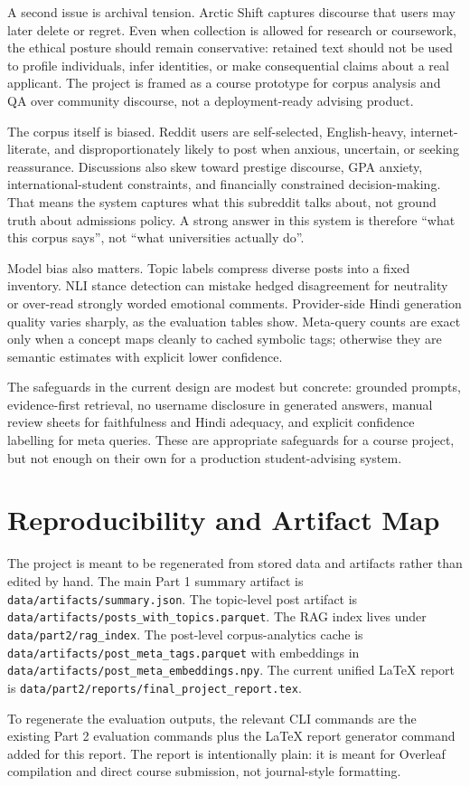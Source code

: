 \documentclass[11pt]{article}
\begin{document}
        A second issue is archival tension. Arctic Shift captures discourse that users may later delete or regret. Even when collection is allowed for research or coursework, the ethical posture should remain conservative: retained text should not be used to profile individuals, infer identities, or make consequential claims about a real applicant. The project is framed as a course prototype for corpus analysis and QA over community discourse, not a deployment-ready advising product.

        The corpus itself is biased. Reddit users are self-selected, English-heavy, internet-literate, and disproportionately likely to post when anxious, uncertain, or seeking reassurance. Discussions also skew toward prestige discourse, GPA anxiety, international-student constraints, and financially constrained decision-making. That means the system captures what this subreddit talks about, not ground truth about admissions policy. A strong answer in this system is therefore ``what this corpus says'', not ``what universities actually do''.

        Model bias also matters. Topic labels compress diverse posts into a fixed inventory. NLI stance detection can mistake hedged disagreement for neutrality or over-read strongly worded emotional comments. Provider-side Hindi generation quality varies sharply, as the evaluation tables show. Meta-query counts are exact only when a concept maps cleanly to cached symbolic tags; otherwise they are semantic estimates with explicit lower confidence.

        The safeguards in the current design are modest but concrete: grounded prompts, evidence-first retrieval, no username disclosure in generated answers, manual review sheets for faithfulness and Hindi adequacy, and explicit confidence labelling for meta queries. These are appropriate safeguards for a course project, but not enough on their own for a production student-advising system.

        \section*{Reproducibility and Artifact Map}
        The project is meant to be regenerated from stored data and artifacts rather than edited by hand. The main Part 1 summary artifact is \texttt{data/artifacts/summary.json}. The topic-level post artifact is \texttt{data/artifacts/posts\_with\_topics.parquet}. The RAG index lives under \texttt{data/part2/rag\_index}. The post-level corpus-analytics cache is \texttt{data/artifacts/post\_meta\_tags.parquet} with embeddings in \texttt{data/artifacts/post\_meta\_embeddings.npy}. The current unified LaTeX report is \texttt{data/part2/reports/final\_project\_report.tex}.

        To regenerate the evaluation outputs, the relevant CLI commands are the existing Part 2 evaluation commands plus the LaTeX report generator command added for this report. The report is intentionally plain: it is meant for Overleaf compilation and direct course submission, not journal-style formatting.

        
\end{document}
